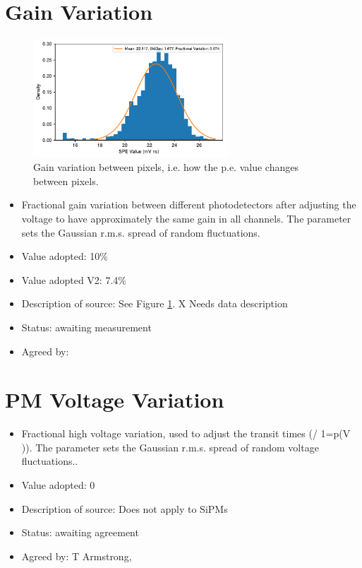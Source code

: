 \documentclass[GCT,short]{gct}
\begin{document}
\section{Gain Variation }

\begin{figure}[h!]
\centering
\includegraphics[width=0.65\textwidth]{../05_gainVariation/checs_gain_variation_v2.pdf}
\caption{Gain variation between pixels, i.e. how the p.e. value changes between pixels.}
\label{fig:gainvar}
\end{figure}

\begin{itemize}
\item Fractional gain variation between different photodetectors after adjusting the voltage to have approximately the same gain in all channels. The parameter sets the Gaussian r.m.s. spread of random fluctuations.
\item Value adopted: 10\%
\item Value adopted V2: 7.4\%
\item Description of source:  See Figure \ref{fig:gainvar}. \color{red} X Needs data description \color{black}
\item Status: \color{orange}awaiting measurement\color{black}
\item Agreed by: 
\end{itemize}


\section{PM Voltage Variation}
\begin{itemize}
\item Fractional high voltage variation, used to adjust the transit times (/ 1=p(V )). The parameter sets the Gaussian r.m.s. spread of random voltage fluctuations..
\item Value adopted: 0 
\item Description of source: Does not apply to SiPMs
\item Status: \color{orange}awaiting agreement\color{black}
\item Agreed by: T Armstrong,
\end{itemize}
\end{document}
